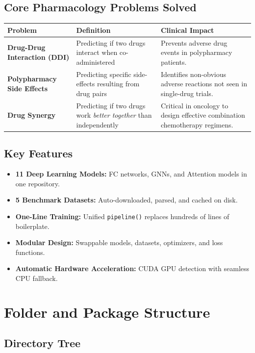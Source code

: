 \documentclass[12pt,a4paper,oneside]{article}
\begin{document}
\subsection{Core Pharmacology Problems Solved}

\begin{longtable}{>{\bfseries}p{4.5cm}p{5cm}p{5cm}}
\toprule
\textbf{Problem} & \textbf{Definition} & \textbf{Clinical Impact} \\
\midrule\endhead
Drug-Drug Interaction (DDI) &
Predicting if two drugs interact when co-administered &
Prevents adverse drug events in polypharmacy patients. \\
\midrule
Polypharmacy Side Effects &
Predicting specific side-effects resulting from drug pairs &
Identifies non-obvious adverse reactions not seen in single-drug trials. \\
\midrule
Drug Synergy &
Predicting if two drugs work \textit{better together} than independently &
Critical in oncology to design effective combination chemotherapy regimens. \\
\bottomrule
\end{longtable}

\subsection{Key Features}
\begin{itemize}
  \item \textbf{11 Deep Learning Models:} FC networks, GNNs, and Attention models in one repository.
  \item \textbf{5 Benchmark Datasets:} Auto-downloaded, parsed, and cached on disk.
  \item \textbf{One-Line Training:} Unified \texttt{pipeline()} replaces hundreds of lines of boilerplate.
  \item \textbf{Modular Design:} Swappable models, datasets, optimizers, and loss functions.
  \item \textbf{Automatic Hardware Acceleration:} CUDA GPU detection with seamless CPU fallback.
\end{itemize}

\section{Folder and Package Structure}\label{sec:folders}

\subsection{Directory Tree}
\end{document}
